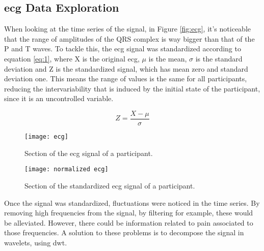 

\subsection{\ac{ecg} Data Exploration}
When looking at the time series of the signal, in Figure \ref{fig:ecg}, it's noticeable that the range of amplitudes of the QRS complex is way bigger than that of the P and T waves.
To tackle this, the \ac{ecg} signal was standardized according to equation \ref{eq:1}, where X is the original \ac{ecg}, $\mu$ is the mean, $\sigma$ is the standard deviation and Z is the standardized signal, which has mean zero and standard deviation one. 
This means the range of values is the same for all participants, reducing the intervariability that is induced by the initial state of the participant, since it is an uncontrolled variable.

\begin{equation} \label{eq:1}
Z = \frac{X-\mu}{\sigma}
\end{equation}


\begin{figure}[htbp]
    \centering
    \begin{minipage}{0.45\textwidth}
        \centering
        \texttt{[image: ecg]}
        \caption{Section of the \ac{ecg} signal of a participant.}
        \label{fig:ecg}
    \end{minipage}
    \hfill
    \begin{minipage}{0.45\textwidth}
        \centering
        \texttt{[image: normalized ecg]}
        \caption{Section of the standardized \ac{ecg} signal of a participant.}
        \label{fig:normalized_ecg}
    \end{minipage}
\end{figure}

Once the signal was standardized, fluctuations were noticed in the time series.
By removing high frequencies from the signal, by filtering for example, these would be alleviated.
However, there could be information related to pain associated to those frequencies.
A solution to these problems is to decompose the signal in wavelets, using \ac{dwt}. 

